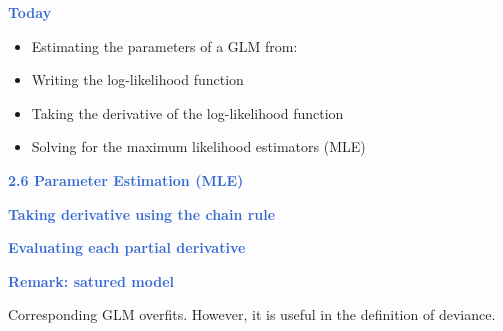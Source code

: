 \documentclass[aspectratio=169,professionalfonts,mathserif]{beamer}
\newcommand{\highlight}[1]{\textcolor{Highlight}{\bf #1}}
\renewcommand{\(}{\left(}
\renewcommand{\)}{\right)}
\renewcommand{\[}{\left[}
\renewcommand{\]}{\right]}
\newcommand{\mytitle}[1]{\vspace*{-1mm}%
  \centerline{\highlight{\Large #1}}\vspace*{3mm}}
\newenvironment{slidebox}{%
  \begin{minipage}[c][7.5cm][t]{14.4cm}\raggedright}{%
  \end{minipage}}
\begin{document}
\begin{frame}\begin{slidebox}
\mytitle{Today}

\begin{itemize}
    \item Estimating the parameters of a GLM from: 
    \pause
    \item Writing the log-likelihood function
    \pause
    \item Taking the derivative of the log-likelihood function
    \pause
    \item Solving for the maximum likelihood estimators (MLE)
\end{itemize}
\end{slidebox}\end{frame}

\begin{frame}\begin{slidebox}
\mytitle{2.6 Parameter Estimation (MLE)}
\end{slidebox}\end{frame}

\begin{frame}\begin{slidebox}
\mytitle{Taking derivative using the chain rule}
\end{slidebox}\end{frame}

\begin{frame}\begin{slidebox}
\mytitle{Evaluating each partial derivative}
\end{slidebox}\end{frame}


\begin{frame}\begin{slidebox}
\mytitle{Remark: satured model}

Corresponding GLM overfits. However, it is useful in the definition of deviance.

\end{slidebox}\end{frame}
\end{document}
